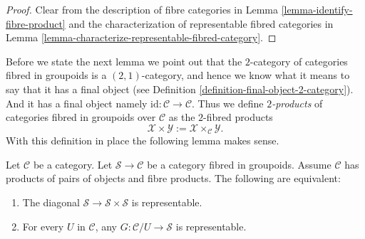 \begin{proof}
Clear from the description of fibre categories in
Lemma \ref{lemma-identify-fibre-product} and the characterization
of representable fibred categories in
Lemma \ref{lemma-characterize-representable-fibred-category}.
\end{proof}

\noindent
Before we state the next lemma we point out that the $2$-category
of categories fibred in groupoids is a $(2, 1)$-category, and hence
we know what it means to say that it has a final object (see
Definition \ref{definition-final-object-2-category}). And it has
a final object namely $\text{id} : \mathcal{C} \to \mathcal{C}$.
Thus we define {\it $2$-products} of categories fibred in groupoids
over $\mathcal{C}$ as the $2$-fibred products
$$
\mathcal{X} \times \mathcal{Y} :=
\mathcal{X} \times_{\mathcal{C}} \mathcal{Y}.
$$
With this definition in place the following lemma makes sense.

\begin{lemma}
\label{lemma-representable-diagonal-groupoids}
Let $\mathcal{C}$ be a category.
Let $\mathcal{S} \to \mathcal{C}$ be a category fibred in groupoids.
Assume $\mathcal{C}$ has products of pairs of objects and fibre products.
The following are equivalent:
\begin{enumerate}
\item The diagonal $\mathcal{S} \to \mathcal{S} \times \mathcal{S}$
is representable.
\item For every $U$ in $\mathcal{C}$, any $G : \mathcal{C}/U \to \mathcal{S}$
is representable.
\end{enumerate}
\end{lemma}


